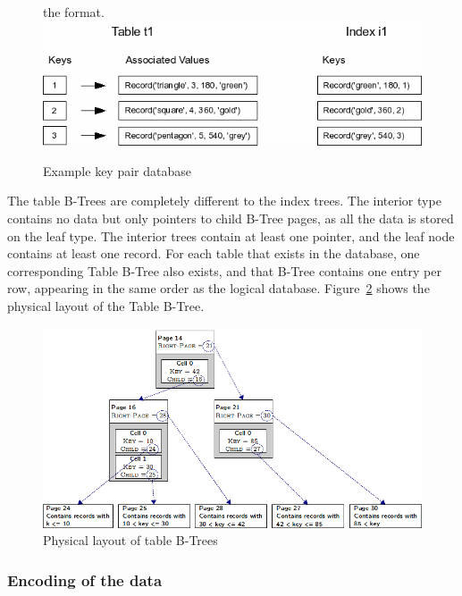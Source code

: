 \begin{figure}[H]the format.
	\centering
	\includegraphics[scale=0.5]{images/examplepop.png}
	\caption{Example key pair database \citep{sqliteray}}
	\label{fig:sqlite_key_pair}
\end{figure}

The table B-Trees are completely different to the index trees. The interior type contains no data but only pointers to child B-Tree pages, as all the data is stored on the leaf type. The interior trees contain at least one pointer, and the leaf node contains at least one record. For each table that exists in the database, one corresponding Table B-Tree also exists, and that B-Tree contains one entry per row, appearing in the same order as the logical database. Figure~\ref{fig:sqlite_table_btree} shows the physical layout of the Table B-Tree. 

\begin{figure}[H]
	\centering
	\includegraphics[scale=0.357]{images/sqlite_table_btree.png}
	\caption{Physical layout of table B-Trees \citep{chibd}}
	\label{fig:sqlite_table_btree}
\end{figure}

\subsubsection{Encoding of the data}
\label{subsubsec:sqlite_data_encoding}

